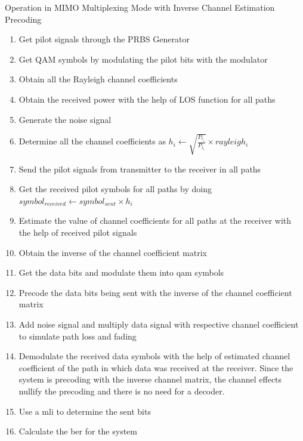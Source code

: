 \begin{algorithm}[!htbp]
\caption{Operation in MIMO Multiplexing Mode with Inverse Channel Estimation Precoding}
\label{alg:Operation in MIMO Inverse Channel Estimation Mode}
\begin{enumerate}
\item Get pilot signals through the PRBS Generator
\item Get QAM symbols by modulating the pilot bits with the modulator
\item Obtain all the Rayleigh channel coefficients
\item Obtain the received power with the help of LOS function for all  paths
\item Generate the noise signal
\item Determine all the channel coefficients as $h_i \gets \sqrt{\frac{P_{r_i}}{P_{t_i}}} \times rayleigh_i$
\item Send the pilot signals from transmitter to the receiver in all paths
\item Get the received pilot symbols for all paths by doing $symbol_{received} \gets symbol_{sent} \times h_i$
\item Estimate the value of channel coefficients for all paths at the receiver with the help of received pilot signals
\item Obtain the inverse of the channel coefficient matrix
\item Get the data bits and modulate them into \acrshort{qam} symbols
\item Precode the data bits being sent with the inverse of the channel coefficient matrix
\item Add noise signal and multiply data signal with respective channel coefficient to simulate path loss and fading
\item Demodulate the received data symbols with the help of estimated channel coefficient of the path in which data was received at the receiver. Since the system is precoding with the inverse channel matrix, the channel effects nullify the precoding and there is no need for a decoder.
\item Use a \acrlong{mli} to determine the sent bits
\item Calculate the \acrshort{ber} for the system
\end{enumerate}
\end{algorithm}

